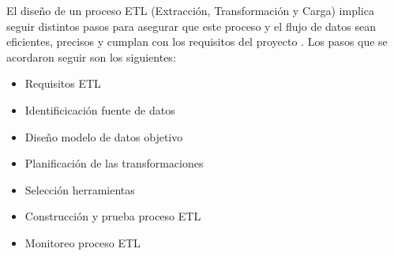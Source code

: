 El diseño de un proceso ETL (Extracción, Transformación y Carga) implica seguir distintos pasos para asegurar que este proceso y el flujo de datos sean eficientes, precisos y cumplan con los requisitos del proyecto \cite{etl-toolkit}. Los pasos que se acordaron seguir son los siguientes:
\begin{itemize}
    \item Requisitos ETL
    \item Identificicación fuente de datos
    \item Diseño modelo de datos objetivo
    \item Planificación de las transformaciones
    \item Selección herramientas
    \item Construcción y prueba proceso ETL
    \item Monitoreo proceso ETL
\end{itemize}
